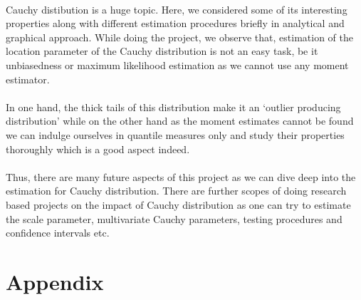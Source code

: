 \documentclass[12pt, fleqn, a4paper]{article}
\begin{document}
	\paragraph{} Cauchy distibution is a huge topic. Here, we considered some of its interesting properties along with different estimation procedures briefly in analytical and graphical approach. While doing the project, we observe that, estimation of the location parameter of the Cauchy distribution is not an easy task, be it unbiasedness or maximum likelihood estimation as we cannot use any moment estimator. 
	\paragraph{} In one hand, the thick tails of this distribution make it an `outlier producing distribution' while on the other hand as the moment estimates cannot be found we can indulge ourselves in quantile measures only and study their properties thoroughly which is a good aspect indeed. 
	\paragraph{} Thus, there are many future aspects of this project as we can dive deep into the estimation for Cauchy distribution. There are further scopes of doing research based projects on the impact of Cauchy distribution as one can try to estimate the scale parameter, multivariate Cauchy parameters, testing procedures and confidence intervals etc. 
	
	\newpage
	\section{Appendix}
\end{document}
